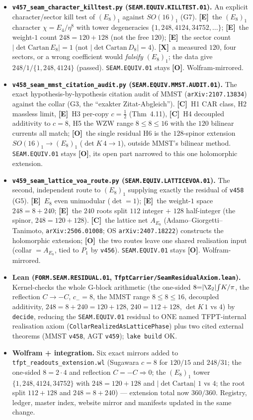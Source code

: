 \documentclass[11pt]{article}
\providecommand{\mE}{\textbf{[E]}}\providecommand{\mC}{\textbf{[C]}}
\providecommand{\mO}{\textbf{[O]}}\providecommand{\mX}{\textbf{[X]}}
\begin{document}
\begin{itemize}
\item \textbf{\texttt{v457\_seam\_character\_killtest.py} (\texttt{SEAM.EQUIV.KILLTEST.01}).} An explicit
character/sector kill test of $(E_8)_1$ against $SO(16)_1$ (G7). \mE\ the $(E_8)_1$ character $\chi{=}E_4/\eta^8$
with tower degeneracies $\{1,248,4124,34752,\dots\}$; \mE\ the weight-$1$ count $248{=}120{+}128$ (not the free $120$); \mE\ the sector
count $|\!\det\mathrm{Cartan}\,E_8|{=}1$ (not $|\!\det\mathrm{Cartan}\,D_8|{=}4$). \mX\ a measured $120$, four sectors,
or a wrong coefficient would \emph{falsify} $(E_8)_1$; the data give $248/1/\{1,248,4124\}$ (passed).
\texttt{SEAM.EQUIV.01} stays \mO. Wolfram-mirrored.
\item \textbf{\texttt{v458\_seam\_mmst\_citation\_audit.py} (\texttt{SEAM.EQUIV.MMST.AUDIT.01}).} The exact
hypothesis-by-hypothesis citation audit of MMST (\texttt{arXiv:2107.13834}) against the collar (G3, the ``exakter
Zitat-Abgleich''). \mC\ H1 CAR class, H2 massless limit, \mE\ H3 per-copy $c{=}\tfrac12$ (Thm~4.11), \mC\ H4 decoupled
additivity to $c{=}8$, H5 the WZW range $8{\le}8{\le}16$ with the $120$ bilinear currents all match; \mO\ the single
residual H6 is the $128$-spinor extension $SO(16)_1{\to}(E_8)_1$ ($\det K\,4{\to}1$), outside MMST's bilinear method.
\texttt{SEAM.EQUIV.01} stays \mO, its open part narrowed to this one holomorphic extension.
\item \textbf{\texttt{v459\_seam\_lattice\_voa\_route.py} (\texttt{SEAM.EQUIV.LATTICEVOA.01}).} The second, independent
route to $(E_8)_1$ supplying exactly the residual of \texttt{v458} (G5). \mE\ $E_8$ even unimodular ($\det{=}1$); \mE\
the weight-$1$ space $248{=}8{+}240$; \mE\ the $240$ roots split $112$ integer $+$ $128$ half-integer (the spinor,
$248{=}120{+}128$). \mC\ the lattice net $A_{E_8}$ (Adamo--Giorgetti--Tanimoto, \texttt{arXiv:2506.01008}; OS
\texttt{arXiv:2407.18222}) constructs the holomorphic extension; \mO\ the two routes leave one shared realisation input
(collar $={}A_{E_8}$, tied to $P_1$ by \texttt{v456}). \texttt{SEAM.EQUIV.01} stays \mO. Wolfram-mirrored.
\item \textbf{Lean (\texttt{FORM.SEAM.RESIDUAL.01}, \texttt{TfptCarrier/SeamResidualAxiom.lean}).} Kernel-checks the
whole G-block arithmetic (the one-sided $8{=}|\Z_2|\!\int\!K/\pi$, the reflection $C{\to}{-}C$, $c_-{=}8$, the MMST
range $8{\le}8{\le}16$, decoupled additivity, $248{=}8{+}240{=}120{+}128$, $240{=}112{+}128$, $\det K\,1$ vs $4$) by
\texttt{decide}, reducing the \texttt{SEAM.EQUIV.01} residual to ONE named TFPT-internal realisation axiom
(\texttt{CollarRealizedAsLatticePhase}) plus two cited external theorems (MMST \texttt{v458}, AGT \texttt{v459});
\texttt{lake build} OK.
\item \textbf{Wolfram + integration.} Six exact mirrors added to \texttt{tfpt\_readouts\_extension.wl} (Sugawara
$c{=}8$ for $120/15$ and $248/31$; the one-sided $8{=}2\cdot4$ and reflection $C{=}{-}C\Rightarrow0$; the $(E_8)_1$
tower $\{1,248,4124,34752\}$ with $248{=}120{+}128$ and $|\!\det\mathrm{Cartan}|$ $1$ vs $4$; the root split
$112{+}128$ and $248{=}8{+}240$) --- extension total now $360/360$. Registry, ledger, master index, website mirror and
manifests updated in the same change.
\end{itemize}
\end{document}
